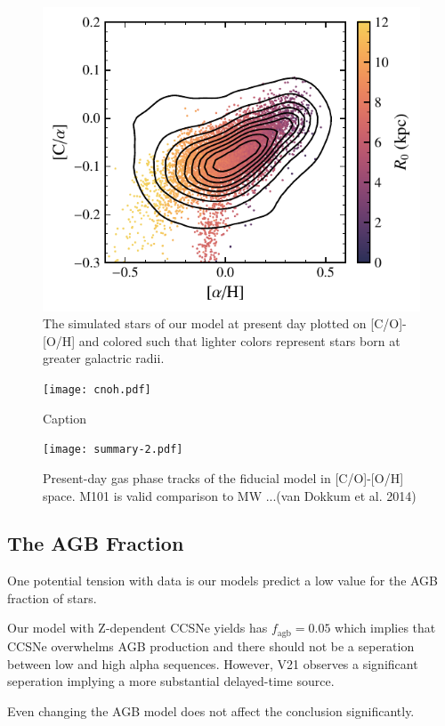 \documentclass[fleqn,usenatbib]{mnras}
\begin{document}
\begin{figure}
    \includegraphics[scale=0.6]{cooh_scatter.pdf}
    \caption{The simulated stars of our model at present day plotted on [C/O]-[O/H] and colored such that lighter colors represent stars born at greater galactric radii.}
\end{figure}

\begin{figure}
    \centering
    \texttt{[image: cnoh.pdf]}
    \caption{Caption}
    \label{fig:cnofe}
\end{figure}


\begin{figure}
\centering
\texttt{[image: summary-2.pdf]}
\caption{Present-day gas phase tracks of the fiducial model in [C/O]-[O/H] space. M101 is valid comparison to MW ...(van Dokkum et al. 2014)}
\label{fig:gas_phase}
\end{figure}
\subsection{The AGB Fraction }
One potential tension with data is our models predict a low value for the AGB fraction of stars. 

Our model with Z-dependent CCSNe yields has $f_\text{agb} = 0.05$ which implies that CCSNe overwhelms AGB production and there should not be a seperation between low and high alpha sequences. However, V21 observes a significant seperation implying a more substantial delayed-time source. 

Even changing the AGB model does not affect the conclusion significantly. 
\end{document}
